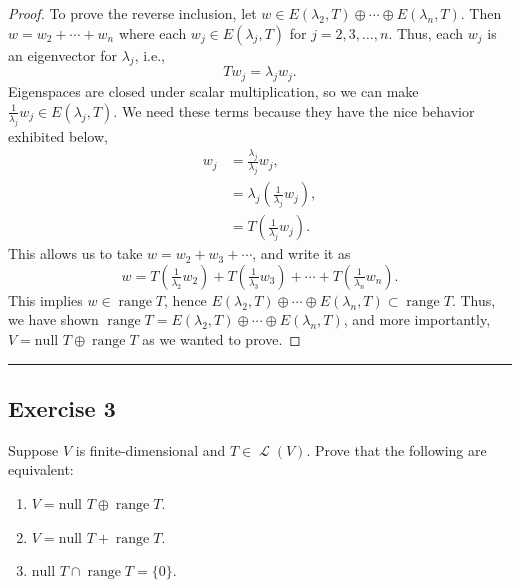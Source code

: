 \documentclass[letterpaper, 12pt]{amsart}
\DeclareMathOperator{\Ell}{\mathscr{L}}				%
\renewcommand{\null}{\text{null }}					%
\DeclareMathOperator{\range}{\text{range }}			%
\theoremstyle{definition}  							%
\begin{document}
\begin{proof}
		To prove the reverse inclusion, let $w \in E(\lambda_{2},T) \oplus \cdots \oplus E(\lambda_{n}, T)$.
		Then $w = w_{2} + \cdots + w_{n}$ where each $w_{j} \in E(\lambda_{j},T)$ for $j = 2,3,\dots,n$.
		Thus, each $w_{j}$ is an eigenvector for $\lambda_{j}$, i.e., $$Tw_{j} = \lambda_{j}w_{j}.$$
		Eigenspaces are closed under scalar multiplication, so we can make $\tfrac{1}{\lambda_{j}}w_{j} \in E(\lambda_{j},T)$.
		We need these terms because they have the nice behavior exhibited below,
			\begin{align*}
				w_{j} &= \frac{\lambda_{j}}{\lambda_{j}} w_{j}, \\
				&= \lambda_{j}\left(\tfrac{1}{\lambda_{j}} w_{j} \right), \\
				&= T\left(\tfrac{1}{\lambda_{j}} w_{j} \right).
			\end{align*}
		This allows us to take $w = w_{2} + w_{3} + \cdots$, and write it as $$w = T\left(\tfrac{1}{\lambda_{2}} w_{2}\right) + T\left(\tfrac{1}{\lambda_{3}} w_{3}\right) + \cdots + T\left(\tfrac{1}{\lambda_{n}} w_{n}\right).$$
		This implies $w \in \range T$, hence $E(\lambda_{2},T) \oplus \cdots \oplus E(\lambda_{n}, T) \subset \range T$.
		Thus, we have shown $\range T = E(\lambda_{2},T) \oplus \cdots \oplus E(\lambda_{n}, T)$, and more importantly, $V = \null T \oplus \range T$ as we wanted to prove.
		\end{proof}
		\vspace*{2mm}
		\hrule
		\vspace*{2mm}

		\subsection*{Exercise 3}
		Suppose $V$ is finite-dimensional and $T \in \Ell(V)$. 
		Prove that the following are equivalent:
			\begin{enumerate}[\hspace*{5mm}(a)]
				\item $V = \null T \oplus \range T$.
				\item $V = \null T + \range T$.
				\item $\null T \cap \range T = \{0\}$.
			\end{enumerate}
		\vspace*{3mm}
\end{document}
